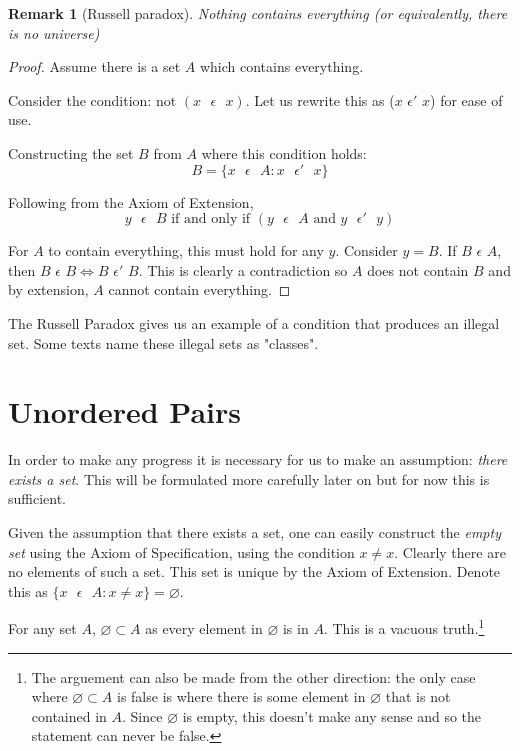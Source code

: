 \documentclass[12pt]{article}
\newtheorem{remark}{Remark}
\begin{document}
\begin{remark}[Russell paradox]
    Nothing contains everything (or equivalently, there is no universe)
\end{remark}
\begin{proof}
    Assume there is a set $A$ which contains everything.

    Consider the condition: $\text{not } (x \text{ } \epsilon \text{ } x)$. Let us rewrite this as ($x$ $\epsilon'$ $x$) for
    ease of use.

    Constructing the set $B$ from $A$ where this condition holds:
    \begin{displaymath}
        B = \{x \text{ } \epsilon \text{ } A: x \text{ } \epsilon' \text{ } x\}
    \end{displaymath}

    Following from the Axiom of Extension,
    \begin{displaymath}
        y \text{ } \epsilon \text{ } B \text{ if and only if } (y \text{ } \epsilon \text{ } A \text{ and } y \text{ } \epsilon' \text{ } y)
    \end{displaymath}

    For $A$ to contain everything, this must hold for any $y$. Consider $y = B$.
    If $B$ $\epsilon$ $A$, then $B$ $\epsilon$ $B \Leftrightarrow B$ $\epsilon'$ $B$. This is clearly a
    contradiction so $A$ does not contain $B$ and by extension, $A$ cannot contain everything.
\end{proof}

The Russell Paradox gives us an example of a condition that produces an illegal set. Some texts name these
illegal sets as "classes".

\section{Unordered Pairs}
In order to make any progress it is necessary for us to make an assumption: \textit{there exists a set}.
This will be formulated more carefully later on but for now this is sufficient.

Given the assumption that there exists a set, one can easily construct the \textit{empty set} using the
Axiom of Specification, using the condition $x \neq x$. Clearly there are no
elements of such a set. This set is unique by the Axiom of Extension. Denote this as $\{x \text{ } \epsilon \text{ } A: x \neq x \} = \varnothing$.

For any set $A$, $\varnothing \subset A$ as every element in $\varnothing$ is in $A$. This is a vacuous truth.\footnote{The
arguement can also be made from the other direction: the only case where $\varnothing \subset A$ is false
is where there is some element in $\varnothing$ that is not contained in $A$. Since $\varnothing$ is empty, this
doesn't make any sense and so the statement can never be false.}
\end{document}
